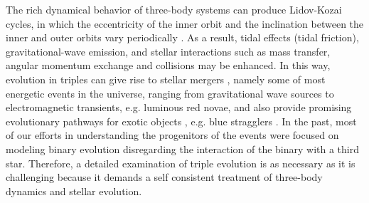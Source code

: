 The rich dynamical behavior of three-body systems can produce Lidov-Kozai cycles, in which the eccentricity of the inner orbit and the inclination between the inner and outer orbits vary periodically \citep{michaely2014secular,toonen2016evolution,mangipudi2022extreme}. As a result, tidal effects (tidal friction), gravitational-wave emission, and stellar interactions such as mass transfer, angular momentum exchange and collisions may be enhanced. In this way, evolution in triples can give rise to stellar mergers \citep{antonini2017binary,silsbee2017lidov,vigna2021massive}, namely some of most energetic events in the universe, ranging from gravitational wave sources to electromagnetic transients, e.g. luminous red novae, and also provide promising evolutionary pathways for exotic objects \citep{sana2012binary, toonen2016evolution}, e.g. blue stragglers \citep{perets2009triple}. In the past, most of our efforts in understanding the progenitors of the events were focused on modeling binary evolution disregarding the interaction of the binary with a third star. Therefore, a detailed examination of triple evolution is as necessary as it is challenging because it demands a self consistent treatment of three-body dynamics and stellar evolution.










